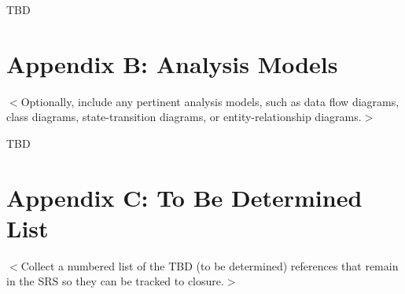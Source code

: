 \documentclass{scrreprt}
\begin{document}
TBD

\section{Appendix B: Analysis Models}
$<$Optionally, include any pertinent analysis models, such as data flow 
diagrams, class diagrams, state-transition diagrams, or entity-relationship 
diagrams.$>$

TBD

\section{Appendix C: To Be Determined List}
$<$Collect a numbered list of the TBD (to be determined) references that remain 
in the SRS so they can be tracked to closure.$>$
\end{document}
